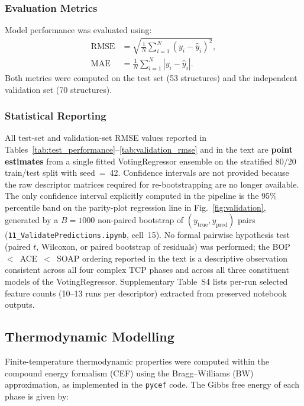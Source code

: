 \subsubsection*{Evaluation Metrics}

Model performance was evaluated using:
\begin{align}
  \text{RMSE} &= \sqrt{\frac{1}{N} \sum_{i=1}^{N} (y_i - \hat{y}_i)^2}, \\
  \text{MAE} &= \frac{1}{N} \sum_{i=1}^{N} |y_i - \hat{y}_i|.
\end{align}
Both metrics were computed on the test set (53 structures) and the independent validation set (70 structures).

\subsubsection*{Statistical Reporting}

All test-set and validation-set RMSE values reported in Tables~\ref{tab:test_performance}--\ref{tab:validation_rmse} and in the text are \textbf{point estimates} from a single fitted VotingRegressor ensemble on the stratified 80/20 train/test split with seed~=~42. Confidence intervals are not provided because the raw descriptor matrices required for re-bootstrapping are no longer available. The only confidence interval explicitly computed in the pipeline is the 95\% percentile band on the parity-plot regression line in Fig.~\ref{fig:validation}, generated by a $B=1000$ non-paired bootstrap of $(y_\text{true}, y_\text{pred})$ pairs (\texttt{11\_ValidatePredictions.ipynb}, cell~15). No formal pairwise hypothesis test (paired $t$, Wilcoxon, or paired bootstrap of residuals) was performed; the BOP~$<$~ACE~$<$~SOAP ordering reported in the text is a descriptive observation consistent across all four complex TCP phases and across all three constituent models of the VotingRegressor. Supplementary Table~S4 lists per-run selected feature counts (10--13 runs per descriptor) extracted from preserved notebook outputs.

\subsection{Thermodynamic Modelling}

Finite-temperature thermodynamic properties were computed within the compound energy formalism (CEF) using the Bragg--Williams (BW) approximation, as implemented in the \texttt{pycef} code. The Gibbs free energy of each phase is given by:

